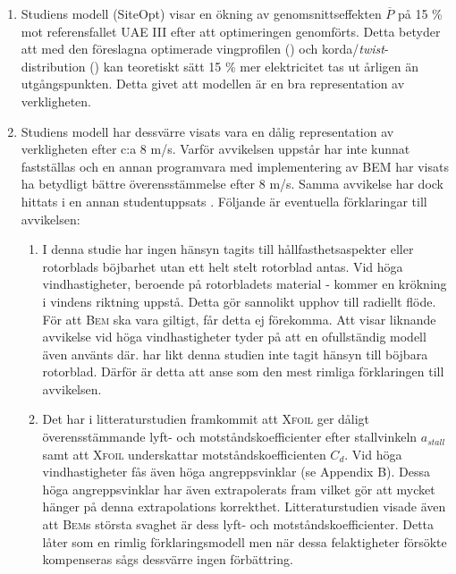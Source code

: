 \begin{enumerate}

    \item Studiens modell (SiteOpt) visar en ökning av genomsnittseffekten $\overline{P}$ på 15 \% mot referensfallet UAE III efter att optimeringen genomförts. Detta betyder att med den föreslagna optimerade vingprofilen () och korda/\emph{twist}-distribution () kan teoretiskt sätt 15 \% mer elektricitet tas ut årligen än utgångspunkten. Detta givet att modellen är en bra representation av verkligheten. 
      
    \item Studiens modell har dessvärre visats vara en dålig representation av verkligheten efter c:a 8 m/s. Varför avvikelsen uppstår har inte kunnat fastställas och en annan programvara med implementering av BEM har visats ha betydligt bättre överensstämmelse efter 8 m/s. Samma avvikelse har dock hittats i en annan studentuppsats \citep{CST}. Följande är eventuella förklaringar till avvikelsen:
    
        \begin{enumerate}
        \item I denna studie har ingen hänsyn tagits till hållfasthetsaspekter eller rotorblads böjbarhet utan ett helt stelt rotorblad antas. Vid höga vindhastigheter, beroende på rotorbladets material - kommer en krökning i vindens riktning uppstå. Detta gör sannolikt upphov till radiellt flöde. För att \textsc{Bem} ska vara giltigt, får detta ej förekomma. Att \citet{CST} visar liknande avvikelse vid höga vindhastigheter tyder på att en ofullständig modell även använts där. \citet{CST} har likt denna studien inte tagit hänsyn till böjbara rotorblad. Därför är detta att anse som den mest rimliga förklaringen till avvikelsen.


        \item Det har i litteraturstudien framkommit att \textsc{Xfoil} ger dåligt överensstämmande lyft- och motståndskoefficienter efter stallvinkeln $a_{stall}$ samt att \textsc{Xfoil} underskattar motståndskoefficienten $C_d$.  Vid höga vindhastigheter fås även höga angreppsvinklar (se Appendix B). Dessa höga angreppsvinklar har även extrapolerats fram vilket gör att mycket hänger på denna extrapolations korrekthet. Litteraturstudien visade även att \textsc{Bem}s största svaghet är dess lyft- och motståndskoefficienter. Detta låter som en rimlig förklaringsmodell men när dessa felaktigheter försökte kompenseras sågs dessvärre ingen förbättring.
        


\end{enumerate}
\end{enumerate}
